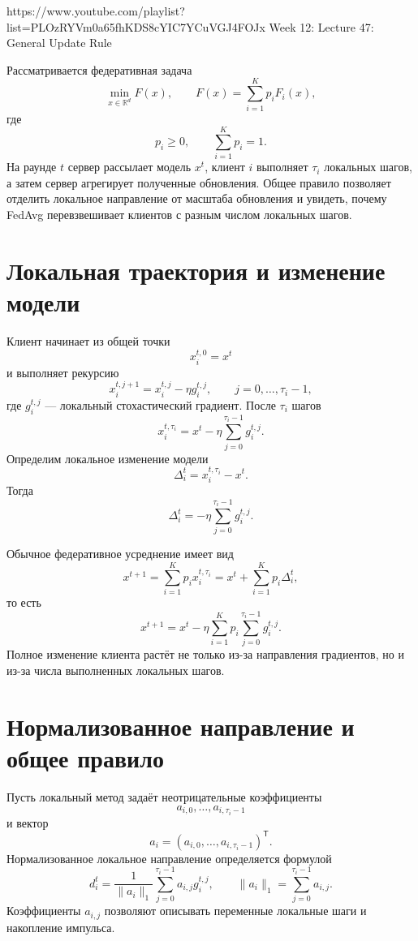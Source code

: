 
\sourcevideo
    {https://www.youtube.com/playlist?list=PLOzRYVm0a65fhKDS8cYIC7YCuVGJ4FOJx}
    {Week 12: Lecture 47: General Update Rule}

Рассматривается федеративная задача
\[
    \min_{x\in\mathbb R^d}F(x),
    \qquad
    F(x)=\sum_{i=1}^{K}p_iF_i(x),
\]
где
\[
    p_i\ge0,
    \qquad
    \sum_{i=1}^{K}p_i=1.
\]
На раунде \(t\) сервер рассылает модель \(x^t\), клиент \(i\)
выполняет \(\tau_i\) локальных шагов, а затем сервер агрегирует
полученные обновления. Общее правило позволяет отделить локальное
направление от масштаба обновления и увидеть, почему FedAvg
перевзвешивает клиентов с разным числом локальных шагов.

\section{Локальная траектория и изменение модели}

Клиент начинает из общей точки
\[
    x_i^{t,0}=x^t
\]
и выполняет рекурсию
\[
    x_i^{t,j+1}
    =
    x_i^{t,j}-\eta g_i^{t,j},
    \qquad
    j=0,\ldots,\tau_i-1,
\]
где \(g_i^{t,j}\) --- локальный стохастический градиент. После
\(\tau_i\) шагов
\[
    x_i^{t,\tau_i}
    =
    x^t
    -
    \eta
    \sum_{j=0}^{\tau_i-1}g_i^{t,j}.
\]
Определим локальное изменение модели
\[
    \Delta_i^t
    =
    x_i^{t,\tau_i}-x^t.
\]
Тогда
\[
    \Delta_i^t
    =
    -\eta
    \sum_{j=0}^{\tau_i-1}g_i^{t,j}.
\]

Обычное федеративное усреднение имеет вид
\[
    x^{t+1}
    =
    \sum_{i=1}^{K}p_i x_i^{t,\tau_i}
    =
    x^t+
    \sum_{i=1}^{K}p_i\Delta_i^t,
\]
то есть
\[
    x^{t+1}
    =
    x^t
    -
    \eta
    \sum_{i=1}^{K}p_i
    \sum_{j=0}^{\tau_i-1}g_i^{t,j}.
\]
Полное изменение клиента растёт не только из-за направления
градиентов, но и из-за числа выполненных локальных шагов.

\section{Нормализованное направление и общее правило}

Пусть локальный метод задаёт неотрицательные коэффициенты
\[
    a_{i,0},\ldots,a_{i,\tau_i-1}
\]
и вектор
\[
    a_i
    =
    (a_{i,0},\ldots,a_{i,\tau_i-1})^{\mathsf T}.
\]
Нормализованное локальное направление определяется формулой
\[
    d_i^t
    =
    \frac1{\lVert a_i\rVert_1}
    \sum_{j=0}^{\tau_i-1}
    a_{i,j}g_i^{t,j},
    \qquad
    \lVert a_i\rVert_1
    =
    \sum_{j=0}^{\tau_i-1}a_{i,j}.
\]
Коэффициенты \(a_{i,j}\) позволяют описывать переменные локальные
шаги и накопление импульса.

